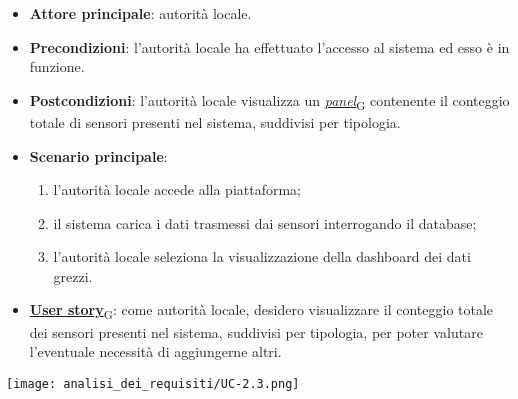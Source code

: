 \begin{itemize}
	\item \textbf{Attore principale}: autorità locale.
	\item \textbf{Precondizioni}: l'autorità locale ha effettuato l'accesso al sistema ed esso è in funzione.
	\item \textbf{Postcondizioni}: l'autorità locale visualizza un \href{https://7last.github.io/docs/pb/documentazione-interna/glossario\#panel}{\textit{panel}\textsubscript{G}} contenente il conteggio totale di sensori presenti nel sistema, suddivisi per tipologia.
	\item \textbf{Scenario principale}:
	      \begin{enumerate}
		      \item l'autorità locale accede alla piattaforma;
		      \item il sistema carica i dati trasmessi dai sensori interrogando il database;
		      \item l'autorità locale seleziona la visualizzazione della dashboard dei dati grezzi.
	      \end{enumerate}
	\item \href{https://7last.github.io/docs/pb/documentazione-interna/glossario\#user-story}{\textbf{User story}\textsubscript{G}}:
	      come autorità locale, desidero visualizzare il conteggio totale dei sensori presenti nel sistema, suddivisi per tipologia, per poter valutare l'eventuale necessità di aggiungerne altri.
\end{itemize}
\begin{center}
	\texttt{[image: analisi\_dei\_requisiti/UC-2.3.png]}
\end{center}

